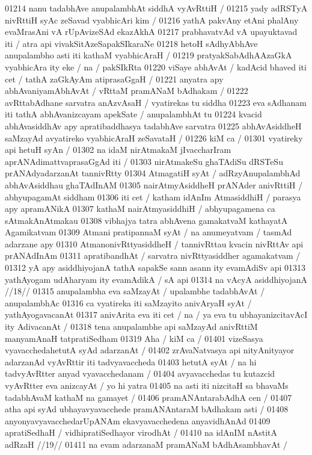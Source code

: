 01214 nanu tadabhAve anupalambhAt siddhA vyAvRttiH /  
01215 	yady adRSTyA nivRttiH syAc zeSavad vyabhicAri kim /
01216 yathA pakvAny etAni phalAny evaMrasAni vA rUpAvizeSAd ekazAkhA
01217 prabhavatvAd vA upayuktavad iti / atra api vivakSitAzeSapakSIkaraNe
01218 hetoH sAdhyAbhAve anupalambho asti iti kathaM vyabhicAraH / 
01219 pratyakSabAdhAAzaGkA vyabhicAra ity eke / na / pakSIkRta
01220 viSaye abhAvAt / kadAcid bhaved iti cet / tathA zaGkAyAm atiprasaGgaH /
01221 anyatra apy abhAvaniyamAbhAvAt / vRttaM pramANaM bAdhakam / 
01222 avRttabAdhane sarvatra anAzvAsaH / vyatirekas tu siddha
01223 eva sAdhanam iti tathA abhAvanizcayam apekSate / anupalambhAt tu  
01224 kvacid abhAvasiddhAv apy apratibaddhasya tadabhAve sarvatra 
01225 abhAvAsiddheH saMzayAd avyatireko vyabhicAraH zeSavataH /
01226 kiM ca /
01301 	vyatireky api hetuH syAn /  
01302 na idaM nirAtmakaM jIvaccharIram aprANAdimattvaprasaGgAd iti /
01303 nirAtmakeSu ghaTAdiSu dRSTeSu prANAdyadarzanAt tannivRtty  
01304 AtmagatiH syAt / adRzyAnupalambhAd abhAvAsiddhau  ghaTAdInAM
01305 nairAtmyAsiddheH prANAder anivRttiH / abhyupagamAt siddham  
01306 iti cet / katham idAnIm AtmasiddhiH / parasya apy apramANikA  
01307 kathaM nairAtmyasiddhiH / abhyupagamena ca sAtmakAnAtmakau 
01308 vibhajya tatra abhAvena gamakatvaM kathayatA Agamikatvam
01309 Atmani pratipannaM syAt / na anumeyatvam / tasmAd adarzane apy
01310 AtmanonivRttyasiddheH / tannivRttau kvacin nivRttAv api prANAdInAm
01311 apratibandhAt / sarvatra nivRttyasiddher agamakatvam /
01312 yA apy asiddhiyojanA tathA sapakSe sann asann ity evamAdiSv api  
01313 yathAyogam udAharyam ity evamAdikA / sA api 
01314 	na vAcyA asiddhiyojanA //18//
01315 anupalambha eva saMzayAt / upalambhe tadabhAvAt / anupalambhAc 
01316 ca vyatireka iti saMzayito anivAryaH syAt / yathAyogavacanAt
01317 anivArita eva iti cet / na / ya eva tu ubhayanizcitavAcI ity AdivacanAt /
01318 tena anupalambhe api saMzayAd anivRttiM manyamAnaH tatpratiSedham
01319 Aha / kiM ca /  
01401 	vizeSasya vyavacchedahetutA syAd adarzanAt /
01402 zrAvaNatvasya api nityAnityayor adarzanAd vyAvRttir iti tadvyavaccheda
01403 hetutA syAt / na hi tadvyAvRtter anyad vyavacchedanam /
01404 avyavacchedas tu kutazcid vyAvRtter eva anizcayAt / yo hi yatra
01405 na asti iti nizcitaH sa bhavaMs tadabhAvaM kathaM na gamayet / 
01406 	pramANAntarabAdhA cen /
01407 atha api syAd ubhayavyavacchede pramANAntaraM bAdhakam asti / 
01408 anyonyavyavacchedarUpANAm ekavyavacchedena anyavidhAnAd 
01409 apratiSedhaH / vidhipratiSedhayor virodhAt / 
01410 	na idAnIM nAstitA adRzaH //19// 
01411 na evam adarzanaM pramANaM bAdhAsambhavAt / 
